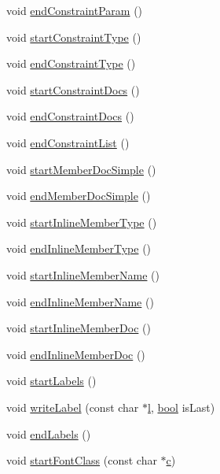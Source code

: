 \begin{DoxyCompactItemize}
void \hyperlink{class_output_list_a9d50347ddbe39ce2328b87913c64bfdb}{end\+Constraint\+Param} ()
\item 
void \hyperlink{class_output_list_a711c480e26d4492f5cd83fc4c9947105}{start\+Constraint\+Type} ()
\item 
void \hyperlink{class_output_list_a0a3b0e8b9a13d824c67f0ca04c5fed0d}{end\+Constraint\+Type} ()
\item 
void \hyperlink{class_output_list_a5e2a94bd45cf237f40a9a0e7eb1386d2}{start\+Constraint\+Docs} ()
\item 
void \hyperlink{class_output_list_a7f4d066d76f000ebeb4d810521573fdf}{end\+Constraint\+Docs} ()
\item 
void \hyperlink{class_output_list_a1f970355071c4cdb7e2e125b8e235070}{end\+Constraint\+List} ()
\item 
void \hyperlink{class_output_list_ab449ad7a2b950cf026341fb1b7c04674}{start\+Member\+Doc\+Simple} ()
\item 
void \hyperlink{class_output_list_ad4fd9e81d01133963c8b33a881318f7c}{end\+Member\+Doc\+Simple} ()
\item 
void \hyperlink{class_output_list_a41ac30b73768699a957c5714e4c347b4}{start\+Inline\+Member\+Type} ()
\item 
void \hyperlink{class_output_list_a3545005c4ed9d2e9058dd3baed0ee5a8}{end\+Inline\+Member\+Type} ()
\item 
void \hyperlink{class_output_list_abd00519713f4249371669240e568d29d}{start\+Inline\+Member\+Name} ()
\item 
void \hyperlink{class_output_list_ad8d98f7851b5215e0f810b0cfcc40e91}{end\+Inline\+Member\+Name} ()
\item 
void \hyperlink{class_output_list_a4627e1a2c83cf21e9b63b6c9b99e5381}{start\+Inline\+Member\+Doc} ()
\item 
void \hyperlink{class_output_list_a70aceb24f76c182ccc5f52285aa235e8}{end\+Inline\+Member\+Doc} ()
\item 
void \hyperlink{class_output_list_ac8244f86d2d0ccbf7e9b0641f1d3a8f6}{start\+Labels} ()
\item 
void \hyperlink{class_output_list_ac2958e2ef34e819d208baed9f4d3559a}{write\+Label} (const char $\ast$\hyperlink{060__command__switch_8tcl_aff56f84b49947b84b2a304f51cf8e678}{l}, \hyperlink{qglobal_8h_a1062901a7428fdd9c7f180f5e01ea056}{bool} is\+Last)
\item 
void \hyperlink{class_output_list_aaf53a952591ed98b004311c5570411a0}{end\+Labels} ()
\item 
void \hyperlink{class_output_list_ace178947661035b39f4dc9076595c24f}{start\+Font\+Class} (const char $\ast$\hyperlink{060__command__switch_8tcl_ab14f56bc3bd7680490ece4ad7815465f}{c})

\end{DoxyCompactItemize}
